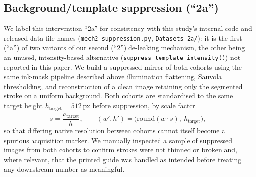 \documentclass[3p,final,10pt]{elsarticle}
\let\oldsubsection\subsection
\renewcommand{\subsection}{\FloatBarrier\oldsubsection}
\begin{document}
\subsection{Background/template suppression (``2a'')}
\label{sec:suppression}
We label this intervention ``2a'' for consistency with this study's
internal code and released data file names
(\texttt{mech2\_suppression.py}, \texttt{Datasets\_2a/}): it is the first
(``a'') of two variants of our second (``2'') de-leaking mechanism, the
other being an unused, intensity-based alternative
(\texttt{suppress\_template\_intensity()}) not reported in this paper. We
build a suppressed mirror of both cohorts using the same ink-mask
pipeline described above illumination flattening, Sauvola thresholding,
and reconstruction of a clean image retaining only the segmented stroke on
a uniform background. Both cohorts are standardised to the same target
height $h_{\mathrm{target}}=512$\,px before suppression, by scale factor
\begin{equation}
s=\frac{h_{\mathrm{target}}}{h},\qquad (w',h')=\bigl(\mathrm{round}(w\cdot s),\ h_{\mathrm{target}}\bigr),
\label{eq:resize}
\end{equation}
so that differing native resolution between cohorts cannot itself become a
spurious acquisition marker. We manually inspected a sample of suppressed
images from both cohorts to confirm strokes were not thinned or broken and,
where relevant, that the printed guide was handled as intended before
treating any downstream number as meaningful.
\end{document}
